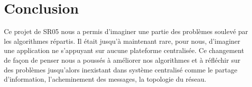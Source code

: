 \section{Conclusion}
Ce projet de SR05 nous a permis d'imaginer une partie des problèmes soulevé par les algorithmes répartis. Il était jusqu'à maintenant rare, pour nous, d'imaginer une application ne s'appuyant sur aucune plateforme centralisée. Ce changement de façon de penser nous a poussés à améliorer nos algorithmes et à réfléchir sur des problèmes jusqu'alors inexistant dans système centralisé comme le partage d'information, l'acheminement des messages, la topologie du réseau.

